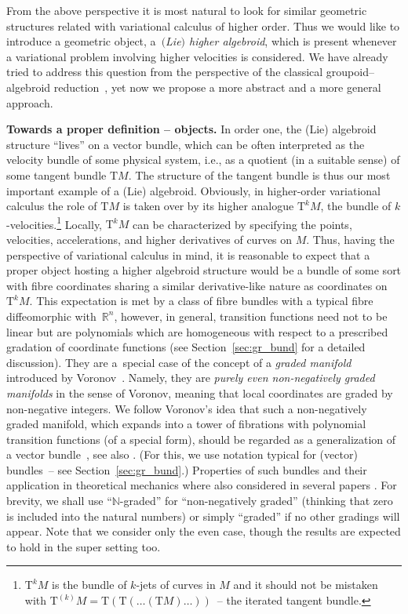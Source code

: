 \documentclass[pdftex]{sigma}
\newcommand{\R}{\mathbb{R}}
\newcommand{\N}{\mathbb{N}}
\newcommand{\T}{\mathrm{T}} %
\newcommand{\TT}[1]{\mathrm{T}^{#1}} %
\numberwithin{equation}{section}
\theoremstyle{definition}
\begin{document}
From the above perspective it is most natural to look for similar geometric structures related with variational calculus of higher order. Thus we would like to introduce a geometric object, a~\emph{$($Lie$)$ higher algebroid}, which is present whenever a variational problem involving higher velocities is considered. We have already tried to address this question from the perspective of the classical groupoid--algebroid reduction~\cite{MJ_MR_models_high_alg_2015}, yet now we propose a more abstract and a more general approach.

{\bf Towards a proper definition -- objects.} In order one, the (Lie) algebroid structure ``lives'' on a vector bundle, which can be often interpreted as the velocity bundle of some physical system, i.e., as a quotient (in a suitable sense) of some tangent bundle $\T M$. The structure of the tangent bundle is thus our most important example of a (Lie) algebroid. Obviously, in higher-order variational calculus the role of $\T M$ is taken over by its higher analogue $\TT{k} M$, the bundle of $k$-velocities.\footnote{$\T^k M$ is the bundle of $k$-jets of curves in $M$ and it should not be mistaken with $\T^{(k)} M = \T(\T(\ldots (\T M)\ldots))$~-- the iterated tangent bundle.} Locally, $\TT{k} M$ can be characterized by specifying the points, velocities, accelerations, and higher derivatives of curves on $M$. Thus, having the perspective of variational calculus in mind, it is reasonable to expect that a proper object hosting a higher algebroid structure would be a bundle of some sort with fibre coordinates sharing a similar derivative-like nature as coordinates on $\TT{k} M$. This expectation is met by a class of fibre bundles with a typical fibre diffeomorphic with~$\R^n$, however, in general, transition functions need not to be linear but are polynomials which are homogeneous with respect to a prescribed gradation of coordinate functions (see Section~\ref{sec:gr_bund} for a detailed discussion). They are a~special case of the concept of a \emph{graded manifold} introduced by Voronov~\cite{Voronov_2002}.
Namely, they are \emph{purely even non-negatively graded manifolds} in the sense of Voronov, meaning that local coordinates are graded by non-negative integers. We follow Voronov's idea that such a non-negatively graded manifold, which expands into a tower of fibrations with polynomial transition functions (of a special form), should be regarded as a generalization of a vector bundle~\cite{Voronov_2002}, see also \cite{Voronov_Q_mfds_high_lie_alg_2010, Voronov_2012_napl, Voronov_2012}. (For this, we use notation typical for (vector) bundles~-- see Section~\ref{sec:gr_bund}.)
Properties of such bundles and their application in theoretical mechanics where also considered in several papers \cite{BGG_2015,BGR, JG_MR_gr_bund_hgm_str_2011}. For brevity, we shall use ``$\N$-graded'' for ``non-negatively graded'' (thinking that zero is included into the natural numbers) or simply ``graded'' if no other gradings will appear. Note that we consider only the even case, though the results are expected to hold in the super setting too.
\end{document}
